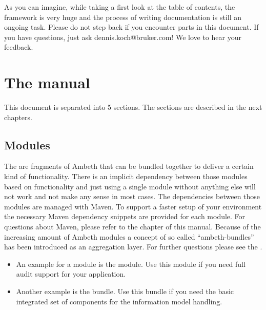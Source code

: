 As you can imagine, while taking a first look at the table of contents, the framework is very huge and the process of writing documentation is still an ongoing task. Please do not step back if you encounter \TODO parts in this document. If you have questions, just ask dennis.koch@bruker.com! We love to hear your feedback.

\section{The manual}
This document is separated into 5 sections. The sections are described in the next chapters.
\subsection{Modules}

The  are fragments of Ambeth that can be bundled together to deliver a certain kind of functionality. There is an implicit dependency between those modules based on functionality and just using a single module without anything else will not work and not make any sense in most cases. The dependencies between those modules are managed with Maven. To support a faster setup of your environment the
necessary Maven dependency snippets are provided for each module. For questions about Maven, please refer to the  chapter of this manual. Because of the increasing amount of Ambeth modules a concept of so called ``ambeth-bundles'' has been introduced as an aggregation layer. For further questions please see the .

\begin{itemize}
  \item An example for a module is the  module. Use this module if you need full  audit support for your application.
  \item Another example is the  bundle. Use this bundle if you need the basic integrated set of components for the information model handling.
\end{itemize}

\def\showimgref{img/platform-overview.png}

